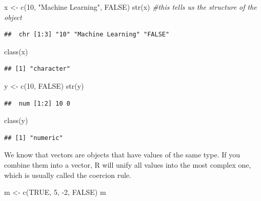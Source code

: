 \documentclass[
]{book}
\newenvironment{Shaded}{\begin{snugshade}}{\end{snugshade}}
\newcommand{\CommentTok}[1]{\textcolor[rgb]{0.56,0.35,0.01}{\textit{#1}}}
\newcommand{\ConstantTok}[1]{\textcolor[rgb]{0.00,0.00,0.00}{#1}}
\newcommand{\DecValTok}[1]{\textcolor[rgb]{0.00,0.00,0.81}{#1}}
\newcommand{\FunctionTok}[1]{\textcolor[rgb]{0.00,0.00,0.00}{#1}}
\newcommand{\NormalTok}[1]{#1}
\newcommand{\OtherTok}[1]{\textcolor[rgb]{0.56,0.35,0.01}{#1}}
\newcommand{\SpecialCharTok}[1]{\textcolor[rgb]{0.00,0.00,0.00}{#1}}
\newcommand{\StringTok}[1]{\textcolor[rgb]{0.31,0.60,0.02}{#1}}
\begin{document}
\begin{Shaded}
\begin{Highlighting}[]
\NormalTok{x }\OtherTok{\textless{}{-}} \FunctionTok{c}\NormalTok{(}\DecValTok{10}\NormalTok{, }\StringTok{"Machine Learning"}\NormalTok{, }\ConstantTok{FALSE}\NormalTok{) }
\FunctionTok{str}\NormalTok{(x) }\CommentTok{\#this tells us the structure of the object}
\end{Highlighting}
\end{Shaded}

\begin{verbatim}
##  chr [1:3] "10" "Machine Learning" "FALSE"
\end{verbatim}

\begin{Shaded}
\begin{Highlighting}[]
\FunctionTok{class}\NormalTok{(x)}
\end{Highlighting}
\end{Shaded}

\begin{verbatim}
## [1] "character"
\end{verbatim}

\begin{Shaded}
\begin{Highlighting}[]
\NormalTok{y }\OtherTok{\textless{}{-}} \FunctionTok{c}\NormalTok{(}\DecValTok{10}\NormalTok{, }\ConstantTok{FALSE}\NormalTok{)}
\FunctionTok{str}\NormalTok{(y)}
\end{Highlighting}
\end{Shaded}

\begin{verbatim}
##  num [1:2] 10 0
\end{verbatim}

\begin{Shaded}
\begin{Highlighting}[]
\FunctionTok{class}\NormalTok{(y)}
\end{Highlighting}
\end{Shaded}

\begin{verbatim}
## [1] "numeric"
\end{verbatim}

We know that vectors are objects that have values of the same type. If you combine them into a vector, R will unify all values into the most complex one, which is usually called the coercion rule.

\begin{Shaded}
\begin{Highlighting}[]
\NormalTok{m }\OtherTok{\textless{}{-}} \FunctionTok{c}\NormalTok{(}\ConstantTok{TRUE}\NormalTok{, }\DecValTok{5}\NormalTok{, }\SpecialCharTok{{-}}\DecValTok{2}\NormalTok{, }\ConstantTok{FALSE}\NormalTok{)}
\NormalTok{m}
\end{Highlighting}
\end{Shaded}
\end{document}
